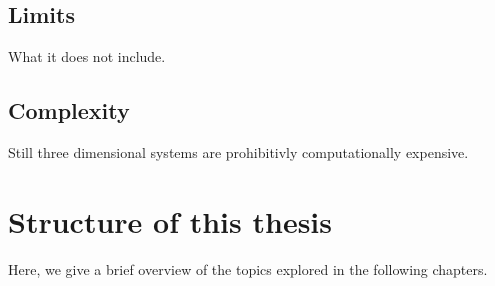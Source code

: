 






\subsection{Limits}
What it does not include.

\subsection{Complexity}
Still three dimensional systems are prohibitivly computationally expensive.




\section{Structure of this thesis}

Here, we give a brief overview of the topics explored in the following chapters.
\vspace{1mm}

